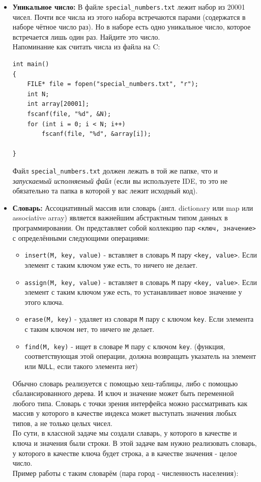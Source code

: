 \documentclass{article}
\begin{document}
\begin{itemize}
\begin{multicols}{1}
\begin{lstlisting}
\end{lstlisting}
\end{multicols}
\item \textbf{Уникальное число:} В файле \texttt{special\_numbers.txt} лежит набор из 20001 чисел. Почти все числа из этого набора встречаются парами (содержатся в наборе чётное число раз). Но в наборе есть одно уникальное число, которое встречается лишь один раз. Найдите это число. \\
Напоминание как считать числа из файла на C:
\begin{lstlisting}
int main()
{
	FILE* file = fopen("special_numbers.txt", "r");
	int N;
	int array[20001];
	fscanf(file, "%d", &N);
	for (int i = 0; i < N; i++)
		fscanf(file, "%d", &array[i]);

}
\end{lstlisting}
Файл \texttt{special\_numbers.txt} должен лежать в той же папке, что и \textit{запускаемый исполняемый файл} (если вы используете IDE, то это не обязательно та папка в которой у вас лежит исходный код).
\item \textbf{Словарь:} Ассоциативный массив или словарь (англ. dictionary или map или associative array) является важнейшим абстрактным типом данных в программировании. Он представляет собой коллекцию пар \texttt{<ключ, значение>} с определёнными следующими операциями:
	\begin{itemize}
	\item \texttt{insert(M, key, value)} - вставляет в словарь \texttt{M} пару \texttt{<key, value>}. Если элемент с таким ключом уже есть, то ничего не делает.
	\item \texttt{assign(M, key, value)} - вставляет в словарь \texttt{M} пару \texttt{<key, value>}. Если элемент с таким ключом уже есть, то устанавливает новое значение у этого ключа.
	\item \texttt{erase(M, key)} - удаляет из словаря \texttt{M} пару с ключом \texttt{key}. Если элемента с таким ключом нет, то ничего не делает.
	\item \texttt{find(M, key)} - ищет в словаре \texttt{M} пару с ключом \texttt{key}. (функция, соответствующая этой операции, должна возвращать указатель на элемент или \texttt{NULL}, если такого элемента нет)
	\end{itemize}

Обычно словарь реализуется с помощью хеш-таблицы, либо с помощью сбалансированного дерева. И ключ и значение может быть переменной любого типа. Словарь с точки зрения интерфейса можно рассматривать как массив у которого в качестве индекса может выступать значения любых типов, а не только целых чисел.\\
По сути, в классной задаче мы создали славарь, у которого в качестве и ключа и значения были строки.
В этой задаче вам нужно реализовать словарь, у которого в качестве ключа будет строка, а в качестве значения - целое число. \\
Пример работы с таким словарём (пара город - численность населения):


\end{itemize}
\end{document}
